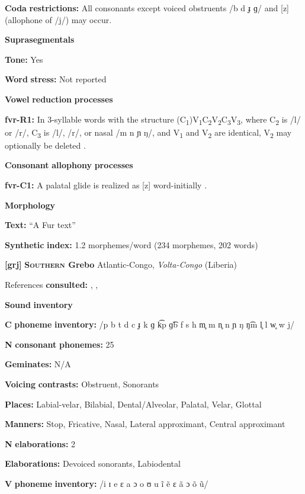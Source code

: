 \begin{styleBody}
\textbf{Coda} \textbf{restrictions:} All consonants except voiced obstruents /b d ɟ ɡ/ and [z] (allophone of /j/) may occur.

\textbf{Suprasegmentals}

\textbf{Tone:} Yes

\textbf{Word} \textbf{stress:} Not reported

\textbf{Vowel} \textbf{reduction} \textbf{processes}

\textbf{fvr-R1:} In 3-syllable words with the structure (C\textsubscript{1})V\textsubscript{1}C\textsubscript{2}V\textsubscript{2}C\textsubscript{3}V\textsubscript{3}, where C\textsubscript{2} is /l/ or /r/, C\textsubscript{3} is /l/, /r/, or nasal /m n ɲ ŋ/, and V\textsubscript{1} and V\textsubscript{2} are identical, V\textsubscript{2} may optionally be deleted \citep[60-61]{Jakobi1990}.

\textbf{Consonant} \textbf{allophony} \textbf{processes}

\textbf{fvr-C1:} A palatal glide is realized as [z] word-initially \citep[19]{Jakobi1990}.

\textbf{Morphology}

\textbf{Text:} “A Fur text” \citep[125-127]{Jakobi1990}

\textbf{Synthetic} \textbf{index:} 1.2 morphemes/word (234 morphemes, 202 words)

\textbf{[grj]}   \textbf{\textsc{Southern} \textbf{Grebo}}  Atlantic-Congo, \textit{Volta-Congo} (Liberia)

References \textbf{consulted:} \citet{Innes1966}, \citet{Innes1981}, \citet{Newman1986}

\textbf{Sound} \textbf{inventory}

\textbf{C} \textbf{phoneme} \textbf{inventory:} /p b t d c ɟ k ɡ k͡p ɡ͡b f s h m̥ m n̥ n ɲ ŋ ŋ͡m l̥ l w̥ w j/

\textbf{N} \textbf{consonant} \textbf{phonemes:} 25

\textbf{Geminates:} N/A

\textbf{Voicing} \textbf{contrasts:} Obstruent, Sonorants

\textbf{Places:} Labial-velar, Bilabial, Dental/Alveolar, Palatal, Velar, Glottal

\textbf{Manners:} Stop, Fricative, Nasal, Lateral approximant, Central approximant

\textbf{N} \textbf{elaborations:} 2

\textbf{Elaborations:} Devoiced sonorants, Labiodental

\textbf{V} \textbf{phoneme} \textbf{inventory:} /i ɪ e ɛ a ɔ o ʊ u ĩ ẽ ɛ ã ɔ õ ũ/


\end{styleBody}

